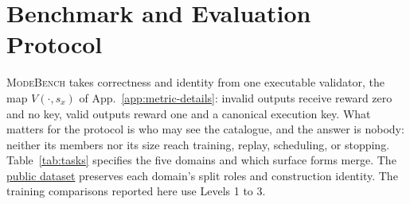\documentclass{article}
\newcommand{\1}{\mathbf 1}
\newcommand{\mb}{\textsc{ModeBench}}
\theoremstyle{remark}
\theoremstyle{definition}
\theoremstyle{plain}
\begin{document}
\section{Benchmark and Evaluation Protocol}
\label{app:data}
\label{app:experimental-design}
\label{app:domain-overview}
\label{app:data-inventory}

\mb{} takes correctness and identity from one executable validator, the map
$V(\cdot,s_x)$ of App.~\ref{app:metric-details}: invalid outputs receive reward
zero and no key, valid outputs reward one and a canonical execution key. What
matters for the protocol is who may see the catalogue, and the answer is nobody:
neither its members nor its size reach training, replay, scheduling, or
stopping.
Table~\ref{tab:tasks} specifies the five domains and which surface forms merge.
The \href{https://huggingface.co/datasets/od2961/ModeBench}{public dataset}
preserves each domain's split roles and construction identity. The training
comparisons reported here use Levels 1 to 3.
\end{document}
